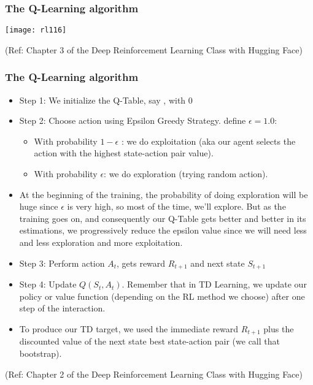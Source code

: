 \begin{frame}[fragile]\frametitle{The Q-Learning algorithm}


\begin{center}
\texttt{[image: rl116]}
\end{center}

{\tiny (Ref: Chapter 3 of the Deep Reinforcement Learning Class with Hugging Face)}

\end{frame}

\begin{frame}[fragile]\frametitle{The Q-Learning algorithm}

\begin{itemize}
\item Step 1: We initialize the Q-Table, say , with 0
\item Step 2: Choose action using Epsilon Greedy Strategy.  define $\epsilon = 1.0$:
\begin{itemize}
\item With probability $1 - \epsilon$ : we do exploitation (aka our agent selects the action with the highest state-action pair value).
\item With probability $\epsilon$: we do exploration (trying random action). 
\end{itemize}
\item At the beginning of the training, the probability of doing exploration will be huge since $\epsilon$ is very high, so most of the time, we'll explore. But as the training goes on, and consequently our Q-Table gets better and better in its estimations, we progressively reduce the epsilon value since we will need less and less exploration and more exploitation.
\item Step 3: Perform action $A_t$, gets reward $R_{t+1}$ and next state $S_{t+1}$
\item Step 4: Update $Q(S_t, A_t)$. Remember that in TD Learning, we update our policy or value function (depending on the RL method we choose) after one step of the interaction.
\item To produce our TD target, we used the immediate reward $R_{t+1}$ plus the discounted value of the next state best state-action pair (we call that bootstrap).

\end{itemize}



{\tiny (Ref: Chapter 2 of the Deep Reinforcement Learning Class with Hugging Face)}

\end{frame}

